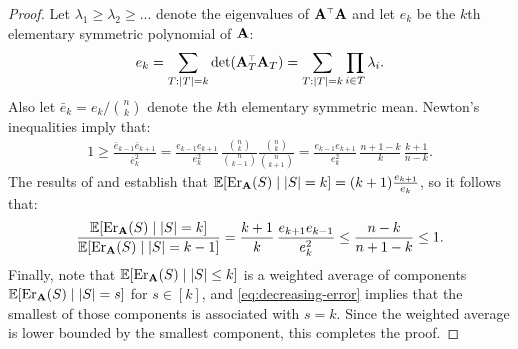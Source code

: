 \documentclass{article}
\begin{document}
\begin{proof}
Let $\lambda_1\geq\lambda_2\geq ...$ denote the eigenvalues of
$\A^\top\A$ and let $e_k$ be the $k$th elementary symmetric polynomial
of $\mathbf A$:
\begin{align*}
e_k = \sum_{T:|T|=k}\det(\A_T^\top\A_T) = \sum_{T:|T|=k}\prod_{i\in T}\lambda_i.
\end{align*}
Also let $\bar{e}_k=e_k/{n\choose k}$ denote the $k$th
elementary symmetric mean. Newton's inequalities imply that:
\begin{align*}
1\geq \frac{\bar e_{k-1}\bar e_{k+1}}{\bar e_k^2} =
  \frac{e_{k-1}e_{k+1}}{e_k^2}\,\frac{{n\choose k}}{{n\choose
  k-1}}\frac{{n\choose k}} {{n\choose k+1}} =
  \frac{e_{k-1}e_{k+1}}{e_k^2}\,\frac{n+1-k}{k}\,\frac{k+1}{n-k}. 
\end{align*}
The results of
\citet{pca-volume-sampling} and \citet{more-efficient-volume-sampling} establish
that $\mathbb E[\mathrm{Er}_\mathbf A(S)\mid |S|=k] = (k+1)\frac{e_{k+1}}{e_k}$, so it
follows that:
\begin{align}
  \frac{\mathbb E[\mathrm{Er}_\mathbf A(S)\mid |S|=k]}{\mathbb E[\mathrm{Er}_\mathbf A(S)\mid|S|=k-1]}
  = \frac{k+1}{k}\,\frac{e_{k+1}e_{k-1}}{e_k^2}\leq
  \frac{n-k}{n+1-k}\leq 1.\label{eq:decreasing-error}
\end{align}
Finally, note that $\mathbb E[\mathrm{Er}_\mathbf A(S)\mid|S|\leq k]$ is a weighted average
of components $\mathbb E[\mathrm{Er}_\mathbf A(S)\mid|S|= s]$ for $s\in[k]$, and
\eqref{eq:decreasing-error} implies that the smallest of those components
is associated with $s=k$. Since the weighted average is lower bounded by the
smallest component, this completes the proof.
  \end{proof}
  
\end{document}
